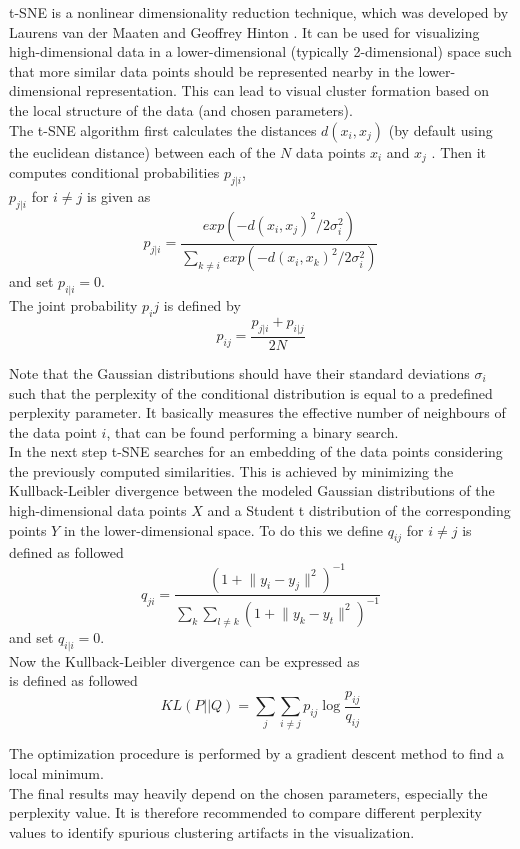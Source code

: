 t-SNE is a nonlinear dimensionality reduction technique, which was developed by Laurens van der Maaten and Geoffrey Hinton \cite{tsne}. It can be used for visualizing high-dimensional data in a lower-dimensional (typically 2-dimensional) space such that more similar data points should be represented nearby in the lower-dimensional representation. This can lead to visual cluster formation based on the local structure of the data (and chosen parameters).  \\
The t-SNE algorithm first calculates the distances $d(x_i, x_j)$ (by default using the euclidean distance) between each of the $N$ data points $x_i$ and $x_j$ \cite{tsne_matlab}. Then it computes conditional probabilities $p_{j|i}$, \cite{tsne} \\
$p_{j|i}$ for $i \neq j$ is given as
\begin{equation}
	p_{j|i} = \frac{exp(-d(x_i, x_j)^2 / 2\sigma_i^2)}{\sum_{k \neq i} exp(-d(x_i, x_k)^2 / 2\sigma_i^2)} 
\end{equation}
and set $p_{i|i} = 0$. \\
The joint probability $p_ij$ is defined by 
\begin{equation}
	p_{ij} = \frac{p_{j|i} + p_{i|j}}{2N}
\end{equation}

Note that the Gaussian distributions should have their standard deviations $\sigma_i$ such that the perplexity of the conditional distribution is equal to a predefined perplexity parameter. It basically measures the effective number of neighbours of the data point $i$, that can be found performing a binary search.   \\
In the next step t-SNE searches for an embedding of the data points considering the previously computed similarities. This is achieved by minimizing the Kullback-Leibler divergence between the modeled Gaussian distributions of the high-dimensional data points $X$ and a Student t distribution of the corresponding points $Y$ in the lower-dimensional space. To do this we define $q_{ij}$ for $i \neq j$ is defined as followed 
\begin{equation}
	q_{ji} = \frac{(1 + \lVert y_i - y_j \rVert ^2)^{-1}}{\sum_{k}\sum_{l \neq k} (1 + \lVert y_k - y_t \rVert ^2)^{-1}}
\end{equation}
and set $q_{i|i} = 0$. \\
Now the Kullback-Leibler divergence can be expressed as \\
is defined as followed 
\begin{equation}
	KL(P||Q) = \sum_{j}\sum_{i \neq j}p_{ij}\log\frac{p_{ij}}{q_{ij}}
\end{equation}

The optimization procedure is performed by a gradient descent method to find a local minimum. \\
The final results may heavily depend on the chosen parameters, especially the perplexity value. It is therefore recommended to compare different perplexity values to identify spurious clustering artifacts in the visualization. \cite{wattenberg2016how}
